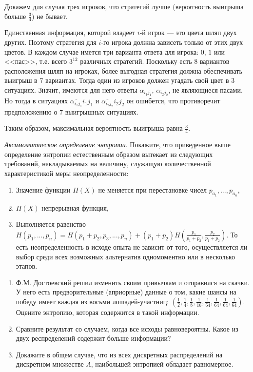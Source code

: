 \begin{remark}
Докажем для случая трех игроков, что стратегий лучше (вероятность выигрыша больше  $ \frac{3}{4}$) не бывает. 

Единственная информация, которой владеет $i$-й игрок --- это цвета шляп двух других. Поэтому стратегия для $i$-го игрока должна зависеть 
только от этих двух цветов. В каждом случае имется три варианта ответа для игрока: $0$, $1$ или <<пас>>, т.е. всего $3^{12}$ различных 
стратегий. Поскольку есть $8$ вариантов расположения шляп на игроках, более выгодная стратегия должна обеспечивать выигрыш в $7$ вариантах. 
Тогда один из игроков должен угадать свой цвет в $3$ ситуациях. Значит, имеются для него ответы $\alpha_{i_1 j_1}$, 
$\alpha_{i_2 j_2}$, не являющиеся пасами. Но тогда в ситуациях $\overline{\alpha_{i_1 j_1}} i_1 j_1$ и 
$\overline{\alpha_{i_2 j_2}} i_2 j_2$ он ошибется, что противоречит предположению о $7$ выигрышных ситуациях. 

Таким образом, максимальная вероятность выигрыша равна $\frac{3}{4}$. 

\end{remark}




\begin{problem} \textit{Аксимоматиеское определение энтропии}.
Покажите, что приведенное выше определение энтропии естественным образом вытекает из следующих требований, накладываемых на величину, служащую количественной характеристикой меры неопределенности:
\begin{enumerate}
\item Значение функции $H(X)$ не меняется при перестановке чисел ${p_{a_1},..., p_{a_n}}$,
\item $H(X)$ непрерывная функция,
\item Выполняется равенство $H(p_1,...,p_n) = H(p_1 + p_2, p_3,..., p_n) + (p_1 + p_2) H(\frac{p_1}{p_1+p_2},\frac{p_2}{p_1+p_2} )$. То есть неопределенность в исходе опыта не зависит от того, осуществляется ли выбор среди всех возможных альтернатив одномоментно или в несколько этапов.
\end{enumerate}
\end{problem}

\begin{problem} 
\begin{enumerate}
\item Ф.М. Достоевский решил изменить своим привычкам и отправился на скачки. У него есть предворительные (априорные) данные о том, какие шансы на победу имеет каждая из восьми лошадей-участниц: $(\frac{1}{2}, \frac{1}{4}, \frac{1}{8}, \frac{1}{16}, \frac{1}{64}, \frac{1}{64}, \frac{1}{64}, \frac{1}{64})$. Оцените энтропию, которая содержится в такой информации. 
\item Сравните результат со случаем, когда все исходы равновероятны. Какое из двух респределений содержит больше информации?
\item Докажите в общем случае, что из всех дискретных распределений на дискретном множестве $A$, наибольшей энтропией обладает равномерное.
\end{enumerate}
\end{problem}


